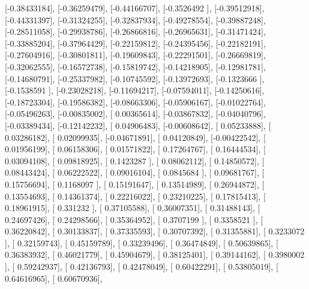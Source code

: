\documentclass{article}
\begin{document}
       [-0.38433184],
       [-0.36259479],
       [-0.44166707],
       [-0.3526492 ],
       [-0.39512918],
       [-0.44331397],
       [-0.31324255],
       [-0.32837934],
       [-0.49278554],
       [-0.39887248],
       [-0.28511058],
       [-0.29938786],
       [-0.26866816],
       [-0.26965631],
       [-0.31471424],
       [-0.33885204],
       [-0.37964429],
       [-0.22159812],
       [-0.24395456],
       [-0.22182191],
       [-0.27604916],
       [-0.30801811],
       [-0.19609843],
       [-0.22291501],
       [-0.26669819],
       [-0.32062555],
       [-0.16572738],
       [-0.15819742],
       [-0.14218905],
       [-0.12981781],
       [-0.14680791],
       [-0.25337982],
       [-0.10745592],
       [-0.13972693],
       [-0.1323666 ],
       [-0.1538591 ],
       [-0.23028218],
       [-0.11694217],
       [-0.07594011],
       [-0.14250616],
       [-0.18723304],
       [-0.19586382],
       [-0.08663306],
       [-0.05906167],
       [-0.01022764],
       [-0.05496263],
       [-0.00835002],
       [ 0.00365614],
       [-0.03867832],
       [-0.04040796],
       [-0.03389434],
       [-0.12142232],
       [ 0.04906483],
       [-0.00608642],
       [ 0.05233888],
       [ 0.03286182],
       [ 0.02099935],
       [-0.04671891],
       [ 0.04120849],
       [-0.00422542],
       [ 0.01956199],
       [ 0.06158306],
       [ 0.01571822],
       [ 0.17264767],
       [ 0.16444534],
       [ 0.03094108],
       [ 0.09818925],
       [ 0.1423287 ],
       [ 0.08062112],
       [ 0.14850572],
       [ 0.08443424],
       [ 0.06222522],
       [ 0.09016104],
       [ 0.0845684 ],
       [ 0.09681767],
       [ 0.15756694],
       [ 0.1168097 ],
       [ 0.15191647],
       [ 0.13514989],
       [ 0.26944872],
       [ 0.13554693],
       [ 0.14361374],
       [ 0.22216022],
       [ 0.23210225],
       [ 0.17815413],
       [ 0.18961915],
       [ 0.331232  ],
       [ 0.37105588],
       [ 0.36007351],
       [ 0.31488143],
       [ 0.24697426],
       [ 0.24298566],
       [ 0.35364952],
       [ 0.3707199 ],
       [ 0.3358521 ],
       [ 0.36220842],
       [ 0.30133837],
       [ 0.37335593],
       [ 0.30707392],
       [ 0.31355881],
       [ 0.3233072 ],
       [ 0.32159743],
       [ 0.45159789],
       [ 0.33239496],
       [ 0.36474849],
       [ 0.50639865],
       [ 0.36383932],
       [ 0.46021779],
       [ 0.45904679],
       [ 0.38125401],
       [ 0.39144162],
       [ 0.3980002 ],
       [ 0.59242937],
       [ 0.42136793],
       [ 0.42478049],
       [ 0.60422291],
       [ 0.53805019],
       [ 0.64616965],
       [ 0.60670936],
\end{document}
